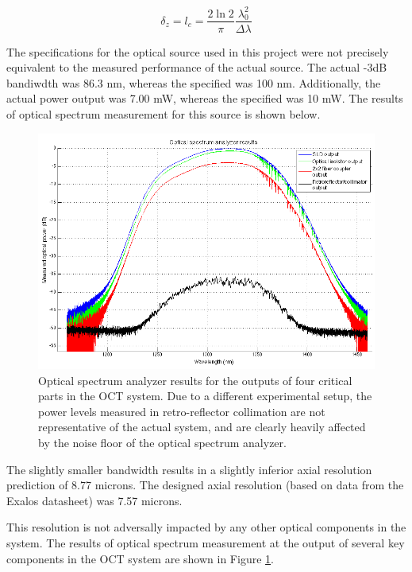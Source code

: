 \begin{equation} \label{eq:ares2}
\delta_z = l_c = \frac{2 \ln{2}}{\pi} \frac{\lambda_0^2}{\Delta \lambda}
\end{equation}

The specifications for the optical source used in this project were not precisely equivalent to the measured performance of the actual source. The actual -3dB bandiwdth was 86.3 nm, whereas the specified was 100 nm. Additionally, the actual power output was 7.00 mW, whereas the specified was 10 mW. The results of optical spectrum measurement for this source is shown below.

\begin{figure}[h!]
\centering
\includegraphics[width=1.0\textwidth]{Images/System/osa.png}
\caption{Optical spectrum analyzer results for the outputs of four critical parts in the OCT system. Due to a different experimental setup, the power levels measured in retro-reflector collimation are not representative of the actual system, and are clearly heavily affected by the noise floor of the optical spectrum analyzer. \label{fig:osa}}
\end{figure}

The slightly smaller bandwidth results in a slightly inferior axial resolution prediction of 8.77 microns. The designed axial resolution (based on data from the Exalos datasheet) was 7.57 microns.

This resolution is not adversally impacted by any other optical components in the system. The results of optical spectrum measurement at the output of several key components in the OCT system are shown in Figure \ref{fig:osa}.

